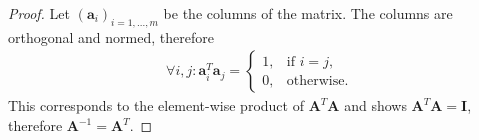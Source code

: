 \begin{proof}
	Let $(\mathbf{a}_i)_{i=1,...,m}$ be the columns of the matrix. The columns are orthogonal and normed, therefore
	\begin{align*}
		\forall i,j: \mathbf{a}_i^T\mathbf{a}_j = \begin{cases}
			1, & \text{if } i=j,\\
			0, & \text{otherwise.}
		\end{cases}
	\end{align*}
	This corresponds to the element-wise product of $\mathbf{A}^T\mathbf{A}$ and shows $\mathbf{A}^T\mathbf{A} = \mathbf{I}$, therefore $\mathbf{A}^{-1} = \mathbf{A}^T$.
\end{proof}